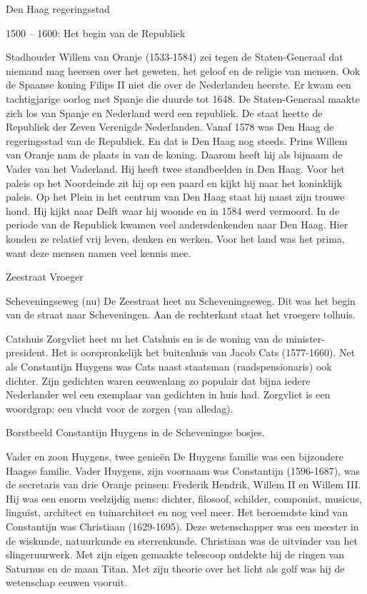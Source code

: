 \documentclass[
  a4paper,
]{book}
\theoremstyle{definition}
\theoremstyle{definition}
\theoremstyle{definition}
\theoremstyle{definition}
\theoremstyle{remark}
\begin{document}
Den Haag regeringsstad

1500 -- 1600: Het begin van de Republiek

Stadhouder Willem van Oranje (1533-1584) zei tegen de Staten-Generaal dat niemand mag heersen over het geweten, het geloof en de religie van mensen.
Ook de Spaanse koning Filips II niet die over de Nederlanden heerste.
Er kwam een tachtigjarige oorlog met Spanje die duurde tot 1648.
De Staten-Generaal maakte zich los van Spanje en Nederland werd een republiek.
De staat heette de Republiek der Zeven Verenigde Nederlanden.
Vanaf 1578 was Den Haag de regeringsstad van de Republiek.
En dat is Den Haag nog steeds.
Prins Willem van Oranje nam de plaats in van de koning.
Daarom heeft hij als bijnaam de Vader van het Vaderland.
Hij heeft twee standbeelden in Den Haag.
Voor het paleis op het Noordeinde zit hij op een paard en kijkt hij naar het koninklijk paleis.
Op het Plein in het centrum van Den Haag staat hij naast zijn trouwe hond.
Hij kijkt naar Delft waar hij woonde en in 1584 werd vermoord.
In de periode van de Republiek kwamen veel andersdenkenden naar Den Haag.
Hier konden ze relatief vrij leven, denken en werken.
Voor het land was het prima, want deze mensen namen veel kennis mee.

Zeestraat Vroeger

Scheveningseweg (nu)
De Zeestraat heet nu Scheveningseweg. Dit was het begin van de straat naar Scheveningen. Aan de rechterkant staat het vroegere tolhuis.

Catshuis
Zorgvliet heet nu het Catshuis en is de woning van de minister-president. Het is oorspronkelijk het buitenhuis van Jacob Cats (1577-1660). Net als Constantijn Huygens was Cats naast staatsman (raadspensionaris) ook dichter. Zijn gedichten waren eeuwenlang zo populair dat bijna iedere Nederlander wel een exemplaar van gedichten in huis had. Zorgvliet is een woordgrap: een vlucht voor de zorgen (van alledag).

Borstbeeld Constantijn Huygens in de Scheveningse bosjes.

Vader en zoon Huygens, twee genieën
De Huygens familie was een bijzondere Haagse familie. Vader Huygens, zijn voornaam was Constantijn (1596-1687), was de secretaris van drie Oranje prinsen: Frederik Hendrik, Willem II en Willem III. Hij was een enorm veelzijdig mens: dichter, filosoof, schilder, componist, musicus, linguïst, architect en tuinarchitect en nog veel meer. Het beroemdste kind van Constantijn was Christiaan (1629-1695). Deze wetenschapper was een meester in de wiskunde, natuurkunde en sterrenkunde. Christiaan was de uitvinder van het slingeruurwerk. Met zijn eigen gemaakte telescoop ontdekte hij de ringen van Saturnus en de maan Titan. Met zijn theorie over het licht als golf was hij de wetenschap eeuwen vooruit.
\end{document}
